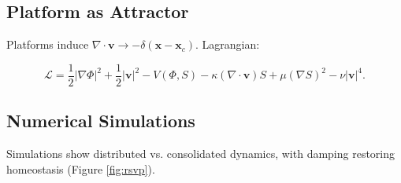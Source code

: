 \documentclass[12pt]{article}
\begin{document}
\subsection{Platform as Attractor}

Platforms induce \(\nabla \cdot \mathbf{v} \to -\delta(\mathbf{x} - \mathbf{x}_c)\). Lagrangian:

\[
\mathcal{L} = \frac{1}{2} |\nabla \Phi|^2 + \frac{1}{2} |\mathbf{v}|^2 - V(\Phi, S) - \kappa (\nabla \cdot \mathbf{v}) S + \mu (\nabla S)^2 - \nu |\mathbf{v}|^4.
\]

\subsection{Numerical Simulations}

Simulations show distributed vs. consolidated dynamics, with damping restoring homeostasis (Figure \ref{fig:rsvp}).
\end{document}
